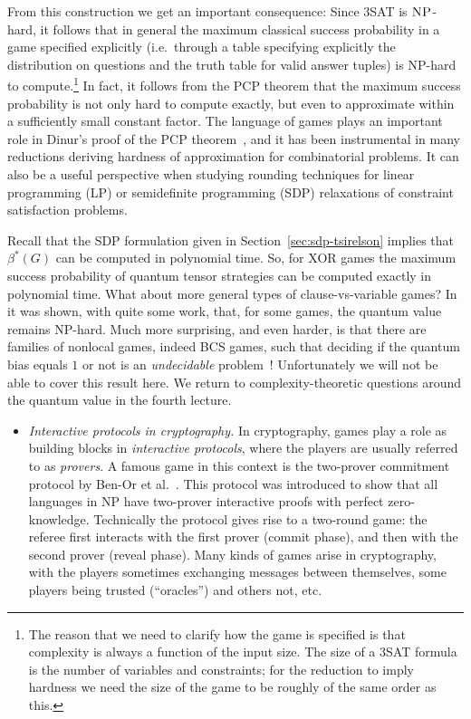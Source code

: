 From this construction we get an important consequence: Since $3$SAT is $\textsc{NP}$-hard, it follows that in general the maximum classical success probability in a game specified explicitly (i.e.\ through a table specifying explicitly the distribution on questions and the truth table for valid answer tuples) is NP-hard to compute.\footnote{The reason that we need to clarify how the game is specified is that complexity is always a function of the input size. The size of a $3$SAT formula is the number of variables and constraints; for the reduction to imply hardness we need the size of the game to be roughly of the same order as this.}
In fact, it follows from the PCP theorem that the maximum success probability is not only hard to compute exactly, but even to approximate within a sufficiently small constant factor. The language of games plays an important role in 
Dinur's proof of the PCP theorem~\cite{dinur2007pcp}, and it has been instrumental in many reductions deriving hardness of approximation for combinatorial problems. It can also be a useful perspective when studying rounding techniques for linear programming (LP) or semidefinite programming (SDP) relaxations of constraint satisfaction problems. 


Recall that the SDP formulation given in Section~\ref{sec:sdp-tsirelson} implies that $\beta^*(G)$ can be computed in polynomial time. So, for XOR games the maximum success probability of quantum tensor strategies can be computed exactly in polynomial time. What about more general types of clause-vs-variable games? In~\cite{} it was shown, with quite some work, that, for some games, the quantum value remains NP-hard. Much more surprising, and even harder, is that there are families of nonlocal games, indeed BCS games, such that deciding if the quantum bias equals $1$ or not is an \emph{undecidable} problem~\cite{}! Unfortunately we will not be able to cover this result here. We return to complexity-theoretic questions around the quantum value in the fourth lecture. 

\begin{itemize}
\item \emph{Interactive protocols in cryptography.} In cryptography, games play a role as building blocks in \emph{interactive protocols}, where the players are usually referred to as \emph{provers}. A famous game in this context is the two-prover commitment protocol by Ben-Or et al.~\cite{ben1988multi}. This protocol was introduced to show that all languages in NP have two-prover interactive proofs with perfect zero-knowledge. Technically the protocol gives rise to a two-round game: the referee first interacts with the first prover (commit phase), and then with the second prover (reveal phase). Many kinds of games arise in cryptography, with the players sometimes exchanging messages between themselves, some players being trusted (``oracles'') and others not, etc. 
\end{itemize}






